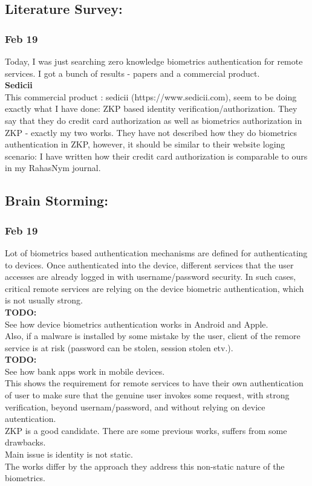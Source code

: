 \documentclass[11pt]{article}
\begin{document}
\subsection*{Literature Survey:}
\subsubsection*{Feb 19}
Today, I was just searching zero knowledge biometrics authentication for remote services. I got a bunch of results - papers and a commercial
product.\\
\textbf{Sedicii}\\
This commercial product : sedicii (https://www.sedicii.com), seem to be doing exactly what I have done: ZKP based identity verification/authorization.
They say that they do credit card authorization as well as biometrics authorization in ZKP - exactly my two works.
They have not described how they do biometrics authentication in ZKP, however, it should be similar to their website loging scenario:
I have written how their credit card authorization is comparable to ours in my RahasNym journal.

\subsection*{Brain Storming:}
\subsubsection*{Feb 19}
Lot of biometrics based authentication mechanisms are defined for authenticating to devices. Once authenticated into the device, different services 
that the user accesses are already logged in with username/password security. In such cases, critical remote services are relying on the device 
biometric authentication, which is not usually strong.\\
\textbf{TODO:} \\ See how device biometrics authentication works in Android and Apple.\\
Also, if a malware is installed by some mistake by the user, client of the remore service is at risk (password can be stolen, session stolen etv.).\\ 
\textbf{TODO:}\\
See how bank apps work in mobile devices.\\

This shows the requirement for remote services to have their own authentication of user to make sure that the genuine user invokes some request, with 
strong verification, beyond usernam/password, and without relying on device autentication.\\
ZKP is a good candidate. There are some previous works, suffers from some drawbacks.\\ Main issue is identity is not static.\\
The works differ by the approach they address this non-static nature of the biometrics.\\
\end{document}
